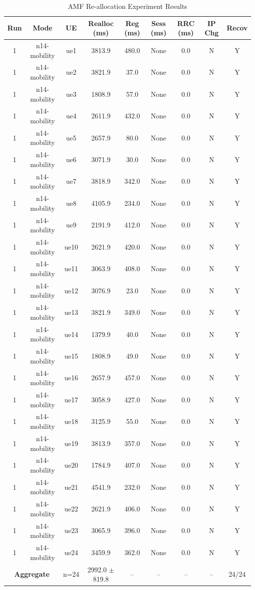 \begin{table}[ht]
\centering
\begin{tabular}{|c|c|c|c|c|c|c|c|c|}
\hline
Run & Mode & UE & Realloc (ms) & Reg (ms) & Sess (ms) & RRC (ms) & IP Chg & Recov \\
\hline
1 & n14-mobility & ue1 & 3813.9 & 480.0 & None & 0.0 & N & Y \\
1 & n14-mobility & ue2 & 3821.9 & 37.0 & None & 0.0 & N & Y \\
1 & n14-mobility & ue3 & 1808.9 & 57.0 & None & 0.0 & N & Y \\
1 & n14-mobility & ue4 & 2611.9 & 432.0 & None & 0.0 & N & Y \\
1 & n14-mobility & ue5 & 2657.9 & 80.0 & None & 0.0 & N & Y \\
1 & n14-mobility & ue6 & 3071.9 & 30.0 & None & 0.0 & N & Y \\
1 & n14-mobility & ue7 & 3818.9 & 342.0 & None & 0.0 & N & Y \\
1 & n14-mobility & ue8 & 4105.9 & 234.0 & None & 0.0 & N & Y \\
1 & n14-mobility & ue9 & 2191.9 & 412.0 & None & 0.0 & N & Y \\
1 & n14-mobility & ue10 & 2621.9 & 420.0 & None & 0.0 & N & Y \\
1 & n14-mobility & ue11 & 3063.9 & 408.0 & None & 0.0 & N & Y \\
1 & n14-mobility & ue12 & 3076.9 & 23.0 & None & 0.0 & N & Y \\
1 & n14-mobility & ue13 & 3821.9 & 349.0 & None & 0.0 & N & Y \\
1 & n14-mobility & ue14 & 1379.9 & 40.0 & None & 0.0 & N & Y \\
1 & n14-mobility & ue15 & 1808.9 & 49.0 & None & 0.0 & N & Y \\
1 & n14-mobility & ue16 & 2657.9 & 457.0 & None & 0.0 & N & Y \\
1 & n14-mobility & ue17 & 3058.9 & 427.0 & None & 0.0 & N & Y \\
1 & n14-mobility & ue18 & 3125.9 & 55.0 & None & 0.0 & N & Y \\
1 & n14-mobility & ue19 & 3813.9 & 357.0 & None & 0.0 & N & Y \\
1 & n14-mobility & ue20 & 1784.9 & 407.0 & None & 0.0 & N & Y \\
1 & n14-mobility & ue21 & 4541.9 & 232.0 & None & 0.0 & N & Y \\
1 & n14-mobility & ue22 & 2621.9 & 406.0 & None & 0.0 & N & Y \\
1 & n14-mobility & ue23 & 3065.9 & 396.0 & None & 0.0 & N & Y \\
1 & n14-mobility & ue24 & 3459.9 & 362.0 & None & 0.0 & N & Y \\
\multicolumn{2}{|c|}{\textbf{Aggregate}} & n=24 & 2992.0 $\pm$ 819.8 & -- & -- & -- & -- & 24/24 \\
\hline
\end{tabular}
\caption{AMF Re-allocation Experiment Results}
\label{tab:amf_realloc}
\end{table}
